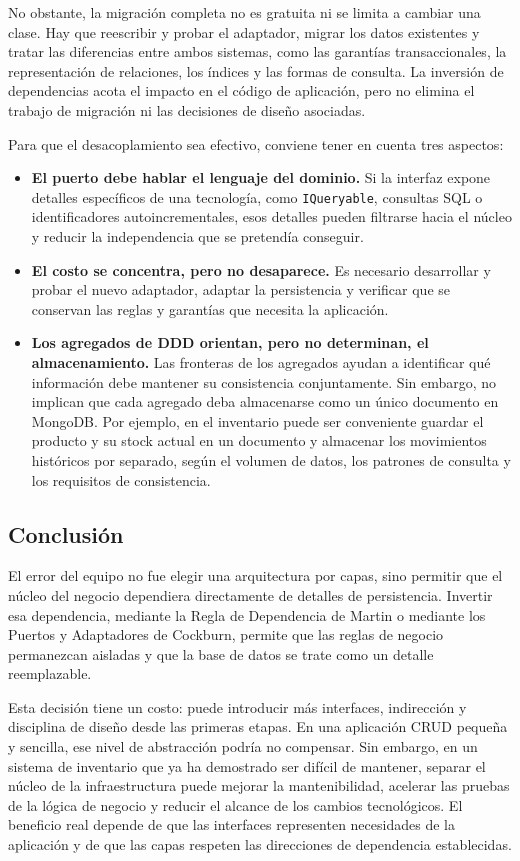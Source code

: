 No obstante, la migración completa no es gratuita ni se limita a cambiar una clase. Hay que reescribir y probar el adaptador, migrar los datos existentes y tratar las diferencias entre ambos sistemas, como las garantías transaccionales, la representación de relaciones, los índices y las formas de consulta. La inversión de dependencias acota el impacto en el código de aplicación, pero no elimina el trabajo de migración ni las decisiones de diseño asociadas.

Para que el desacoplamiento sea efectivo, conviene tener en cuenta tres aspectos:

\begin{itemize}
    \item \textbf{El puerto debe hablar el lenguaje del dominio.} Si la interfaz expone detalles específicos de una tecnología, como \texttt{IQueryable}, consultas SQL o identificadores autoincrementales, esos detalles pueden filtrarse hacia el núcleo y reducir la independencia que se pretendía conseguir.

    \item \textbf{El costo se concentra, pero no desaparece.} Es necesario desarrollar y probar el nuevo adaptador, adaptar la persistencia y verificar que se conservan las reglas y garantías que necesita la aplicación.

    \item \textbf{Los agregados de DDD orientan, pero no determinan, el almacenamiento.} Las fronteras de los agregados ayudan a identificar qué información debe mantener su consistencia conjuntamente. Sin embargo, no implican que cada agregado deba almacenarse como un único documento en MongoDB. Por ejemplo, en el inventario puede ser conveniente guardar el producto y su stock actual en un documento y almacenar los movimientos históricos por separado, según el volumen de datos, los patrones de consulta y los requisitos de consistencia.
\end{itemize}

\subsection{Conclusión}

El error del equipo no fue elegir una arquitectura por capas, sino permitir que el núcleo del negocio dependiera directamente de detalles de persistencia. Invertir esa dependencia, mediante la Regla de Dependencia de Martin o mediante los Puertos y Adaptadores de Cockburn, permite que las reglas de negocio permanezcan aisladas y que la base de datos se trate como un detalle reemplazable.

Esta decisión tiene un costo: puede introducir más interfaces, indirección y disciplina de diseño desde las primeras etapas. En una aplicación CRUD pequeña y sencilla, ese nivel de abstracción podría no compensar. Sin embargo, en un sistema de inventario que ya ha demostrado ser difícil de mantener, separar el núcleo de la infraestructura puede mejorar la mantenibilidad, acelerar las pruebas de la lógica de negocio y reducir el alcance de los cambios tecnológicos. El beneficio real depende de que las interfaces representen necesidades de la aplicación y de que las capas respeten las direcciones de dependencia establecidas.
